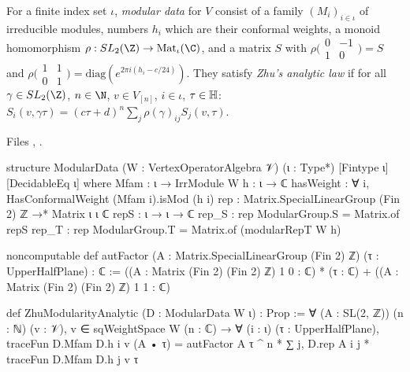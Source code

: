 \begin{definition}\label{l15:def:modulardata}
For a finite index set $\iota$, \emph{modular data} for $V$ consist of a family $(M_i)_{i\in\iota}$ of irreducible modules, numbers
$h_i$ which are their conformal weights, a monoid homomorphism $\rho:\lfifteenSL\to\mathrm{Mat}_\iota(\C)$, and a matrix $S$
with $\rho\bigl(\begin{smallmatrix}0&-1\\1&0\end{smallmatrix}\bigr)=S$ and $\rho\bigl(\begin{smallmatrix}1&1\\0&1\end{smallmatrix}\bigr)=\mathrm{diag}(e^{2\pi i(h_i-c/24)})$.
They satisfy \emph{Zhu's analytic law} if for all $\gamma\in\lfifteenSL$, $n\in\N$, $v\in V_{[n]}$, $i\in\iota$, $\tau\in\mathbb{H}$:
$S_i(v,\gamma\tau)=(c\tau+d)^n\sum_j\rho(\gamma)_{ij}S_j(v,\tau)$.
\end{definition}
\noindent Files ,
.
\begin{leancode}
structure ModularData (W : VertexOperatorAlgebra 𝒱) (ι : Type*) [Fintype ι] [DecidableEq ι] where
  Mfam : ι → IrrModule W
  h : ι → ℂ
  hasWeight : ∀ i, HasConformalWeight (Mfam i).isMod (h i)
  rep : Matrix.SpecialLinearGroup (Fin 2) ℤ →* Matrix ι ι ℂ
  repS : ι → ι → ℂ
  rep_S : rep ModularGroup.S = Matrix.of repS
  rep_T : rep ModularGroup.T = Matrix.of (modularRepT W h)

noncomputable def autFactor (A : Matrix.SpecialLinearGroup (Fin 2) ℤ) (τ : UpperHalfPlane) : ℂ :=
  ((A : Matrix (Fin 2) (Fin 2) ℤ) 1 0 : ℂ) * (τ : ℂ)
    + ((A : Matrix (Fin 2) (Fin 2) ℤ) 1 1 : ℂ)

def ZhuModularityAnalytic (D : ModularData W ι) : Prop :=
  ∀ (A : SL(2, ℤ)) (n : ℕ) (v : 𝒱), v ∈ sqWeightSpace W (n : ℂ) → ∀ (i : ι) (τ : UpperHalfPlane),
    traceFun D.Mfam D.h i v (A • τ)
      = autFactor A τ ^ n * ∑ j, D.rep A i j * traceFun D.Mfam D.h j v τ
\end{leancode}

